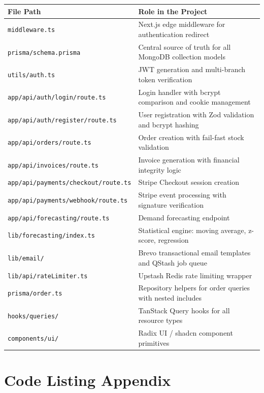 \documentclass[12pt,a4paper]{report}
\begin{document}
\begin{tabularx}{\textwidth}{l X}
    \toprule
    \textbf{File Path} & \textbf{Role in the Project} \\
    \midrule
    \texttt{middleware.ts} & Next.js edge middleware for authentication redirect \\
    \texttt{prisma/schema.prisma} & Central source of truth for all MongoDB collection models \\
    \texttt{utils/auth.ts} & JWT generation and multi-branch token verification \\
    \texttt{app/api/auth/login/route.ts} & Login handler with bcrypt comparison and cookie management \\
    \texttt{app/api/auth/register/route.ts} & User registration with Zod validation and bcrypt hashing \\
    \texttt{app/api/orders/route.ts} & Order creation with fail-fast stock validation \\
    \texttt{app/api/invoices/route.ts} & Invoice generation with financial integrity logic \\
    \texttt{app/api/payments/checkout/route.ts} & Stripe Checkout session creation \\
    \texttt{app/api/payments/webhook/route.ts} & Stripe event processing with signature verification \\
    \texttt{app/api/forecasting/route.ts} & Demand forecasting endpoint \\
    \texttt{lib/forecasting/index.ts} & Statistical engine: moving average, z-score, regression \\
    \texttt{lib/email/} & Brevo transactional email templates and QStash job queue \\
    \texttt{lib/api/rateLimiter.ts} & Upstash Redis rate limiting wrapper \\
    \texttt{prisma/order.ts} & Repository helpers for order queries with nested includes \\
    \texttt{hooks/queries/} & TanStack Query hooks for all resource types \\
    \texttt{components/ui/} & Radix UI / shadcn component primitives \\
    \bottomrule
\end{tabularx}

\chapter{Code Listing Appendix}
\end{document}
